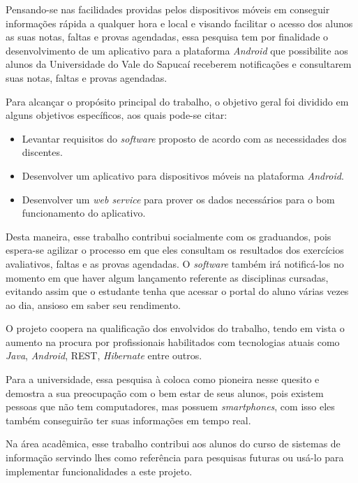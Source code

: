 	\par Pensando-se nas facilidades providas pelos dispositivos móveis em
conseguir informações rápida a qualquer hora e local e visando facilitar o
acesso dos alunos as suas notas, faltas e provas agendadas, essa pesquisa
tem por finalidade o desenvolvimento de um aplicativo para a plataforma
\textit{Android} que possibilite aos alunos da Universidade do Vale do Sapucaí
receberem notificações e consultarem suas notas, faltas e provas agendadas.

	
	\par Para alcançar o propósito principal do trabalho,
o objetivo geral foi dividido em alguns objetivos específicos,
aos quais pode-se citar:
	
	\begin{itemize}
	  
	  \item Levantar requisitos do \textit{software} proposto de acordo com as
	  necessidades dos discentes.
	  
	  \item Desenvolver um aplicativo para dispositivos móveis na plataforma
	  \textit{Android}.
	  
	  \item Desenvolver um \textit{web service} para prover os dados necessários
	  para o bom funcionamento do aplicativo.
	
	\end{itemize}
	
	\par Desta maneira, esse trabalho contribui socialmente com os graduandos,
pois espera-se agilizar o processo em que eles consultam os resultados dos
exercícios avaliativos, faltas e as provas agendadas. O \textit{software}
também irá notificá-los no momento em que haver algum lançamento referente
as disciplinas cursadas, evitando assim que o estudante tenha que acessar o
portal do aluno várias vezes ao dia, ansioso em saber seu rendimento. 

	\par O projeto coopera na qualificação dos envolvidos do trabalho,
tendo em vista o aumento na procura por profissionais habilitados com
tecnologias atuais como \textit{Java}, \textit{Android}, REST,
\textit{Hibernate} entre outros.

	\par Para a universidade, essa pesquisa à coloca como pioneira nesse
quesito e demostra a sua preocupação com o bem estar de seus alunos,
pois existem pessoas que não tem computadores, mas possuem
\textit{smartphones}, com isso eles também conseguirão ter suas informações em tempo real.

	\par Na área acadêmica, esse trabalho contribui aos alunos do curso
de sistemas de informação servindo lhes como referência para pesquisas
futuras ou usá-lo para implementar funcionalidades a este projeto.
